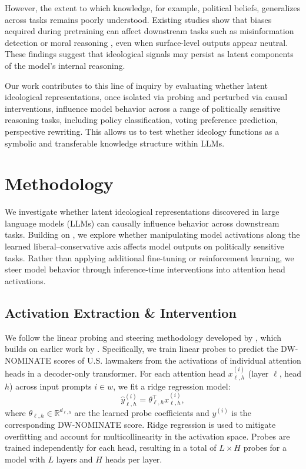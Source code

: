 \documentclass[11pt]{article}
\begin{document}
However, the extent to which knowledge, for example, political beliefs, generalizes across tasks remains poorly understood. Existing studies show that biases acquired during pretraining can affect downstream tasks such as misinformation detection or moral reasoning \citep{fengPretrainingDataLanguage2023, guptaBiasRunsDeep2023}, even when surface-level outputs appear neutral. These findings suggest that ideological signals may persist as latent components of the model’s internal reasoning.

Our work contributes to this line of inquiry by evaluating whether latent ideological representations, once isolated via probing and perturbed via causal interventions, influence model behavior across a range of politically sensitive reasoning tasks, including policy classification, voting preference prediction, perspective rewriting. This allows us to test whether ideology functions as a symbolic and transferable knowledge structure within LLMs.

\section{Methodology}

We investigate whether latent ideological representations discovered in large language models (LLMs) can causally influence behavior across downstream tasks. Building on \citet{kimLinearRepresentationsPolitical2025}, we explore whether manipulating model activations along the learned liberal--conservative axis affects model outputs on politically sensitive tasks. Rather than applying additional fine-tuning or reinforcement learning, we steer model behavior through inference-time interventions into attention head activations.

\subsection{Activation Extraction \& Intervention}

We follow the linear probing and steering methodology developed by \citet{kimLinearRepresentationsPolitical2025}, which builds on earlier work by \citet{liInferenceTimeInterventionEliciting2023}. Specifically, we train linear probes to predict the DW-NOMINATE scores of U.S. lawmakers from the activations of individual attention heads in a decoder-only transformer. For each attention head \(x_{\ell,h}^{(i)}\) (layer \(\ell\), head \(h\)) across input prompts \(i \in w\), we fit a ridge regression model:
\[
\hat{y}^{(i)}_{\ell,h} = \theta_{\ell,h}^\top x_{\ell,h}^{(i)},
\]
where \(\theta_{\ell,h} \in \mathbb{R}^{d_{\ell,h}}\) are the learned probe coefficients and \(y^{(i)}\) is the corresponding DW-NOMINATE score. Ridge regression is used to mitigate overfitting and account for multicollinearity in the activation space. Probes are trained independently for each head, resulting in a total of \(L \times H\) probes for a model with \(L\) layers and \(H\) heads per layer.
\end{document}
